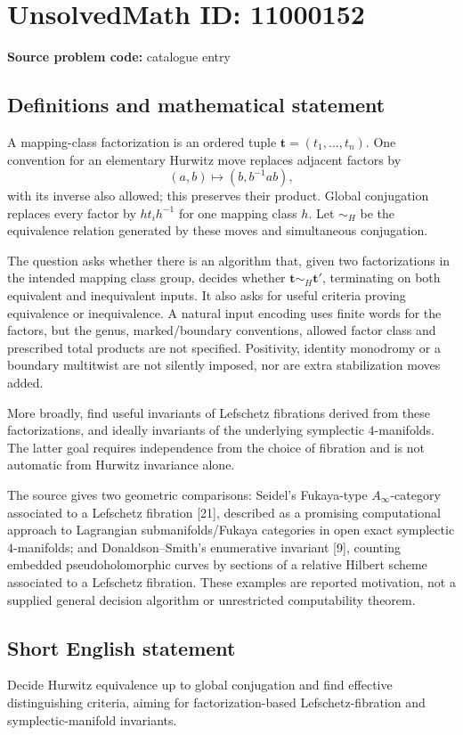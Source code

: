 \documentclass[11pt]{article}
\begin{document}
\section*{UnsolvedMath ID: 11000152}
\textbf{Source problem code:} catalogue entry
\subsection{Definitions and mathematical statement}
A mapping-class factorization is an ordered tuple \(\mathbf t=(t_1,\ldots,t_n)\). One convention for an elementary Hurwitz move replaces adjacent factors by
\[
 (a,b)\longmapsto(b,b^{-1}ab),
\]
with its inverse also allowed; this preserves their product. Global conjugation replaces every factor by \(ht_ih^{-1}\) for one mapping class \(h\). Let \(\sim_H\) be the equivalence relation generated by these moves and simultaneous conjugation.

The question asks whether there is an algorithm that, given two factorizations in the intended mapping class group, decides whether \(\mathbf t\sim_H\mathbf t'\), terminating on both equivalent and inequivalent inputs. It also asks for useful criteria proving equivalence or inequivalence. A natural input encoding uses finite words for the factors, but the genus, marked/boundary conventions, allowed factor class and prescribed total products are not specified. Positivity, identity monodromy or a boundary multitwist are not silently imposed, nor are extra stabilization moves added.

More broadly, find useful invariants of Lefschetz fibrations derived from these factorizations, and ideally invariants of the underlying symplectic \(4\)-manifolds. The latter goal requires independence from the choice of fibration and is not automatic from Hurwitz invariance alone.

The source gives two geometric comparisons: Seidel's Fukaya-type \(A_\infty\)-category associated to a Lefschetz fibration [21], described as a promising computational approach to Lagrangian submanifolds/Fukaya categories in open exact symplectic \(4\)-manifolds; and Donaldson--Smith's enumerative invariant [9], counting embedded pseudoholomorphic curves by sections of a relative Hilbert scheme associated to a Lefschetz fibration. These examples are reported motivation, not a supplied general decision algorithm or unrestricted computability theorem.
\subsection{Short English statement}
Decide Hurwitz equivalence up to global conjugation and find effective distinguishing criteria, aiming for factorization-based Lefschetz-fibration and symplectic-manifold invariants.
\end{document}
